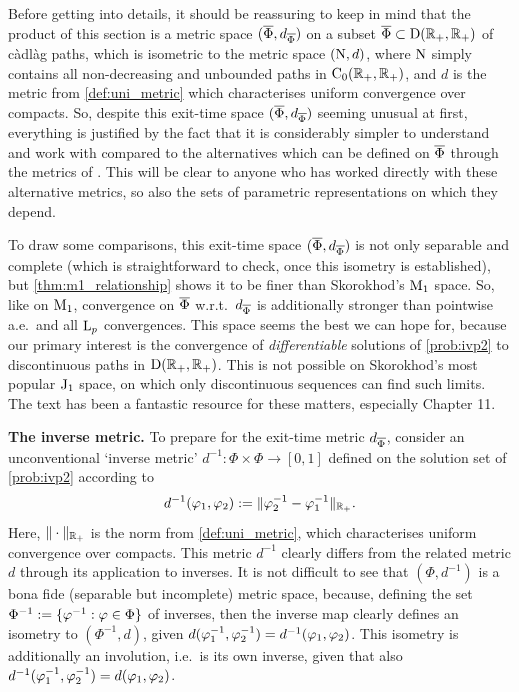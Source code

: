 Before getting into details, it should be reassuring to keep in mind that the product of this section is a metric space $(\overline{\Phi},d_{\overline{\Phi}})$ on a subset $\overline{\Phi}\subset \mathrm{D}(\mathbb{R}_+,\mathbb{R}_+)$ of c\`adl\`ag paths, which is isometric to the metric space $(\mathrm{N},d)$, where $\mathrm{N}$ simply contains all non-decreasing and unbounded paths in $\mathrm{C}_0(\mathbb{R}_+,\mathbb{R}_+)$, and $d$ is the metric from \autoref{def:uni_metric} which characterises uniform convergence over compacts. So, despite this exit-time space $(\overline{\Phi},d_{\overline{\Phi}})$ seeming unusual at first, everything is justified by the fact that it is considerably simpler to understand and work with compared to the alternatives which can be defined on $\overline{\Phi}$ through the metrics of \cite{skorokhod_1956}. This will be clear to anyone who has worked directly with these alternative metrics, so also the sets of parametric representations on which they depend.

To draw some comparisons, this exit-time space $(\overline{\Phi},d_{\overline{\Phi}})$ is not only separable and complete (which is straightforward to check, once this isometry is established), but \autoref{thm:m1_relationship} shows it to be finer than Skorokhod's $\mathrm{M}_1$ space. So, like on $\mathrm{M}_1$, convergence on $\overline{\Phi}$ w.r.t.~$d_{\overline{\Phi}}$ is additionally stronger than pointwise a.e.~and all $\mathrm{L}_p$ convergences. This space seems the best we can hope for, because our primary interest is the convergence of \emph{differentiable} solutions of \autoref{prob:ivp2} to discontinuous paths in $\mathrm{D}(\mathbb{R}_+,\mathbb{R}_+)$. This is not possible on Skorokhod's most popular $\mathrm{J}_1$ space, on which only discontinuous sequences can find such limits. The text \cite{whitt_2002} has been a fantastic resource for these matters, especially Chapter 11.

\vspace{3mm}\textbf{The inverse metric.} To prepare for the exit-time metric $d_{\overline{\Phi}}$, consider an unconventional `inverse metric' $d^{-1}:\Phi\times\Phi\to[0,1]$ defined on the solution set of \autoref{prob:ivp2} according to
\begin{equation}\label{eq:inv_metric}
     d^{-1}(\varphi_1,\varphi_2) := \Vert \varphi_2^{-1} - \varphi^{-1}_1\Vert_{\mathbb{R}_+}.
\end{equation}
Here, $\Vert\cdot\Vert_{\mathbb{R}_+}$ is the norm from \autoref{def:uni_metric}, which characterises uniform convergence over compacts. This metric $d^{-1}$ clearly differs from the related metric $d$ through its application to inverses. It is not difficult to see that $(\Phi,d^{-1})$ is a bona fide (separable but incomplete) metric space, because, defining the set $\Phi^{-1}:=\{\varphi^{-1}:\varphi\in\Phi\}$ of inverses, then the inverse map clearly defines an isometry to $(\Phi^{-1},d)$, given $d(\varphi_1^{-1},\varphi_2^{-1})=d^{-1}(\varphi_1,\varphi_2)$. This isometry is additionally an involution, i.e.~is its own inverse, given that also $d^{-1}(\varphi_1^{-1},\varphi_2^{-1}) = d(\varphi_1,\varphi_2)$.

